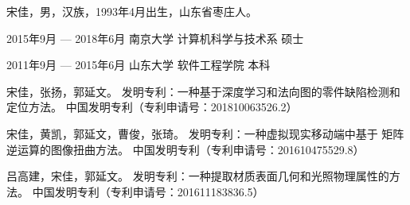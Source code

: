 \begin{resume}
\begin{authorinfo}
\noindent 宋佳，男，汉族，1993年4月出生，山东省枣庄人。
\end{authorinfo}
\begin{education}
\item[2015年9月 --- 2018年6月] 南京大学 计算机科学与技术系 \hfill 硕士
\item[2011年9月 --- 2015年6月] 山东大学 软件工程学院 \hfill 本科
\end{education}
\begin{publications}
\item 宋佳，张扬，郭延文。
发明专利：一种基于深度学习和法向图的零件缺陷检测和定位方法。
中国发明专利（专利申请号：201810063526.2）
\item 宋佳，黄凯，郭延文，曹俊，张琦。
发明专利：一种虚拟现实移动端中基于
矩阵逆运算的图像扭曲方法。
中国发明专利（专利申请号：201610475529.8） 
\item 吕高建，宋佳，郭延文。
发明专利：一种提取材质表面几何和光照物理属性的方法。
中国发明专利（专利申请号：201611183836.5）
\end{publications}
\end{resume}
